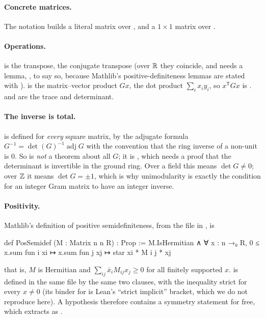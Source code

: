 \paragraph{Concrete matrices.} The notation \lean{!![0, 1; 1, 0]} builds a literal matrix
over , and \lean{!![R \^{} 2]} a $1\times1$ matrix over .

\paragraph{Operations.}  is the transpose,  the conjugate transpose
(over $\mathbb{R}$ they coincide, and  needs a lemma,
, to say so, because Mathlib's
positive-definiteness lemmas are stated with ).  is the
matrix--vector product $Gx$,  the dot product $\sum_i x_i y_i$, so
$x^{\mathsf T}Gx$ is .  and  are the trace
and determinant.

\paragraph{The inverse is total.}  is defined for \emph{every} square matrix,
by the adjugate formula $G^{-1} = \det(G)^{-1}\operatorname{adj}G$ with the convention
that the ring inverse of a non-unit is $0$. So  is \emph{not} a theorem
about all $G$; it is , which needs a proof
 that the determinant is invertible in the ground ring. Over a
field this means $\det G\neq0$; over $\mathbb{Z}$ it means $\det G=\pm1$, which is why
unimodularity is exactly the condition for an integer Gram matrix to have an integer
inverse.

\paragraph{Positivity.} Mathlib's definition of positive semidefiniteness, from the
file  in , is
\begin{leancode}
def PosSemidef (M : Matrix n n R) : Prop :=
  M.IsHermitian ∧
    ∀ x : n →₀ R, 0 ≤ x.sum fun i xi ↦ x.sum fun j xj ↦ star xi * M i j * xj
\end{leancode}
that is, $M$ is Hermitian and $\sum_{ij}\bar x_i M_{ij}x_j\ge0$ for all finitely
supported $x$.  is defined in the same file by the same two clauses, with the
inequality strict for every $x\neq0$ (its binder for  is Lean's ``strict
implicit'' bracket, which we do not reproduce here). A  hypothesis therefore contains a symmetry statement
for free, which  extracts as .

